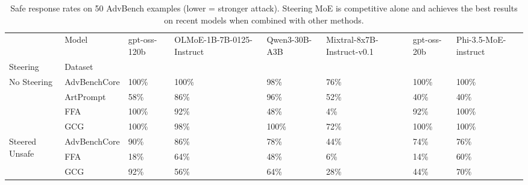 \begin{table}
	\setlength\tabcolsep{5pt}
    \scriptsize
    \centering
    \tabcolsep=0.10cm
    \begin{tabular}{llllllll}
\toprule
 & Model & gpt-oss-120b & OLMoE-1B-7B-0125-Instruct & Qwen3-30B-A3B & Mixtral-8x7B-Instruct-v0.1 & gpt-oss-20b & Phi-3.5-MoE-instruct \\
Steering & Dataset &  &  &  &  &  &  \\
\midrule
\multirow[t]{4}{*}{No Steering} & AdvBenchCore & 100\% & 100\% & 98\% & 76\% & 100\% & 100\% \\
 & ArtPrompt & 58\% & 86\% & 96\% & 52\% & 40\% & 40\% \\
 & FFA & 100\% & 92\% & 48\% & 4\% & 92\% & 100\% \\
 & GCG & 100\% & 98\% & 100\% & 72\% & 100\% & 100\% \\
\cline{1-8}
\multirow[t]{4}{*}{Steered Unsafe} & AdvBenchCore & 90\% & 86\% & 78\% & 44\% & 74\% & 76\% \\
 & FFA & 18\% & 64\% & 48\% & 6\% & 14\% & 60\% \\
 & GCG & 92\% & 56\% & 64\% & 28\% & 44\% & 70\% \\
\cline{1-8}
\bottomrule
\end{tabular}
	\caption{Safe response rates on 50 AdvBench examples (lower = stronger attack). Steering MoE is competitive alone and achieves the best results on recent models when combined with other methods.}
	\label{tab:baselines_all}
\end{table}
